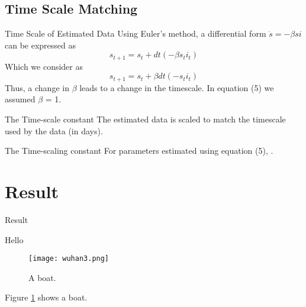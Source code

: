 \documentclass{beamer}
\begin{document}
\subsection{Time Scale Matching}
\begin{frame}{Time Scale of Estimated Data}
Using Euler’s method, a differential form $\dot{s}=-\beta si$ can be expressed as
	$$s_{t+1} = s_t + dt (-\beta s_t i_t)$$
Which we consider as 
	$$s_{t+1} = s_t + \beta dt (- s_t i_t)$$
Thus, a change in $\beta$ leads to a change in the timescale. In equation (5) we assumed $\beta$ = 1. \\
\end{frame}

\begin{frame}{The Time-scale constant}
The estimated data is scaled to match the timescale used by the data (in days). 
\end{frame}

\begin{frame}{The Time-scaling constant}
For parameters estimated using equation (5), . 

\end{frame}


\section{Result}
\begin{frame}{Result}

Hello

\begin{figure}
  \texttt{[image: wuhan3.png]}
  \caption{A boat.}
  \label{fig:boat1}
\end{figure}

Figure \ref{fig:boat1} shows a boat.



\end{frame}
\end{document}
